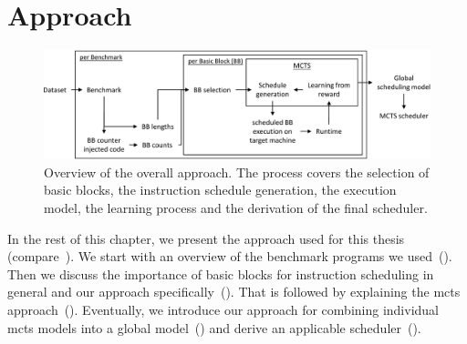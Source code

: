 \chapter{Approach}

\begin{figure}
    \centering
    \includegraphics[width=\textwidth]{img/ppt/approach_overview-crop.pdf}
    \caption[Overview of the approach]{Overview of the overall approach. 
    The process covers the selection of basic blocks, the instruction schedule generation, the execution model, the learning process and the derivation of the final scheduler.}
    \label{fig:approach:overview}
\end{figure}
In the rest of this chapter, we present the approach used for this thesis (compare~).
We start with an overview of the benchmark programs we used~().
Then we discuss the importance of basic blocks for instruction scheduling in general and our approach specifically~().
That is followed by explaining the \ac{mcts} approach~().
Eventually, we introduce our approach for combining individual \ac{mcts} models into a global model~() and derive an applicable scheduler~().

